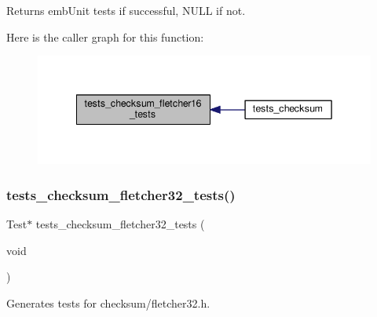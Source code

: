 \begin{DoxyReturn}{Returns}
emb\+Unit tests if successful, N\+U\+LL if not. 
\end{DoxyReturn}
Here is the caller graph for this function\+:
\nopagebreak
\begin{figure}[H]
\begin{center}
\leavevmode
\includegraphics[width=342pt]{group__unittests_gae4f6cce052a84dde051799a5a57d9e44_icgraph}
\end{center}
\end{figure}
\mbox{\label{group__unittests_gaa0b18302e117209cfda9e5cdc7cd5af8}} 
\subsubsection{\texorpdfstring{tests\+\_\+checksum\+\_\+fletcher32\+\_\+tests()}{tests\_checksum\_fletcher32\_tests()}}
{\footnotesize\ttfamily Test$\ast$ tests\+\_\+checksum\+\_\+fletcher32\+\_\+tests (\begin{DoxyParamCaption}\item[{void}]{ }\end{DoxyParamCaption})}



Generates tests for checksum/fletcher32.\+h. 

